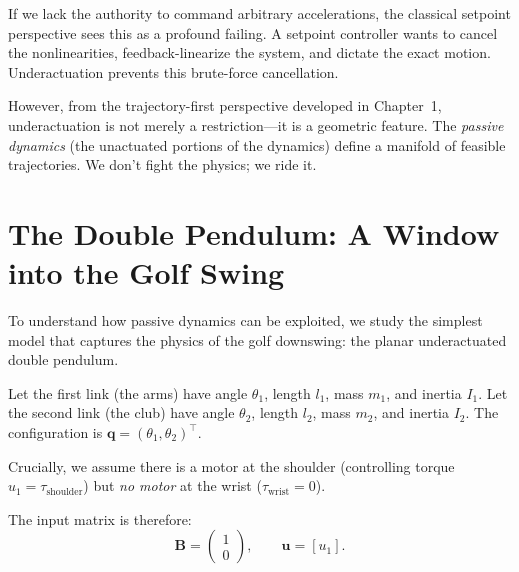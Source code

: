 \documentclass[12pt, openany]{book}
\theoremstyle{plain}
\newcommand{\control}{\bm{u}}
\newcommand{\Bmat}{\bm{B}}
\begin{document}
If we lack the authority to command arbitrary accelerations, the classical setpoint perspective sees this as a profound failing. A setpoint controller wants to cancel the nonlinearities, feedback-linearize the system, and dictate the exact motion. Underactuation prevents this brute-force cancellation. 

However, from the trajectory-first perspective developed in Chapter~1, underactuation is not merely a restriction---it is a geometric feature. The \emph{passive dynamics} (the unactuated portions of the dynamics) define a manifold of feasible trajectories. We don't fight the physics; we ride it. 

\section{The Double Pendulum: A Window into the Golf Swing}

To understand how passive dynamics can be exploited, we study the simplest model that captures the physics of the golf downswing: the planar underactuated double pendulum.

Let the first link (the arms) have angle $\theta_1$, length $l_1$, mass $m_1$, and inertia $I_1$. Let the second link (the club) have angle $\theta_2$, length $l_2$, mass $m_2$, and inertia $I_2$. The configuration is $\bm{q} = (\theta_1, \theta_2)^\top$.

Crucially, we assume there is a motor at the shoulder (controlling torque $u_1 = \tau_{\text{shoulder}}$) but \emph{no motor} at the wrist ($\tau_{\text{wrist}} = 0$).

The input matrix is therefore:
\begin{equation}
  \Bmat = \begin{pmatrix} 1 \\ 0 \end{pmatrix}, \qquad \control = [u_1].
\end{equation}
\end{document}
